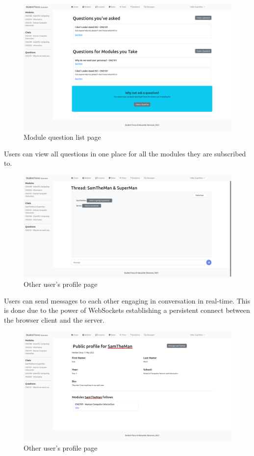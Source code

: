 \begin{figure}[H]
\centering
\includegraphics[scale=0.20]{images/application/21 - all_questions.png}
\caption{Module question list page}
\label{fig:figure2}
\end{figure}

Users can view all questions in one place for all the modules they are subscribed to.

\begin{figure}[H]
\centering
\includegraphics[scale=0.20]{images/application/26 - message_thread_on_refresh.png}
\caption{Other user's profile page}
\label{fig:figure2}
\end{figure}

Users can send messages to each other engaging in conversation in real-time. This is done due to the power of WebSockets establishing a persistent connect between the browser client and the server.

\begin{figure}[H]
\centering
\includegraphics[scale=0.20]{images/application/27 - sams_profile.png}
\caption{Other user's profile page}
\label{fig:figure2}
\end{figure}

